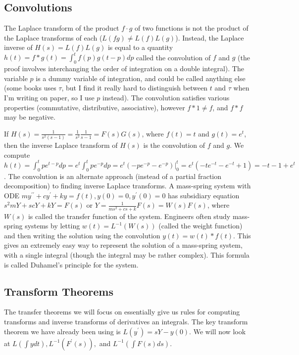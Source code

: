\subsection{Convolutions}
The Laplace transform of the product $f\cdot g$ of two functions is not the product of the Laplace transforms of each ($L(fg)\neq L(f)L(g)$).  Instead, the Laplace inverse of $H(s) = L(f)L(g)$ is equal to a quantity $h(t) = f * g (t) = \int_0^t f(p)g(t-p)dp$ called the convolution of $f$ and $g$ (the proof involves interchanging the order of integration on a double integral). The variable $p$ is a dummy variable of integration, and could be called anything else (some books uses $\tau$, but I find it really hard to distinguish between $t$ and $\tau$ when I'm writing on paper, so I use $p$ instead). The convolution satisfies various properties (commutative, distributive, associative), however $f* 1\neq f$, and $f * f$ may be negative.

If $H(s) = \frac{1}{s^2(s-1)} = \frac{1}{s^2}\frac{1}{s-1} = F(s)G(s)$, where $f(t)=t$ and $g(t)=e^t$, then the inverse Laplace transform of $H(s)$ is the convolution of $f$ and $g$. We compute $h(t) = \int_0^t p e^{t-p}dp= e^t\int_0^tpe^{-p}dp = e^t\left(-pe^{-p}-e^{-p}\right)\big|_0^t=e^t\left(-te^{-t}-e^{-t}+1\right) = -t-1+e^t$.  The convolution is an alternate approach (instead of a partial fraction decomposition) to finding inverse Laplace transforms. A mass-spring system with ODE $my^{\prime\prime}+cy^\prime+ky=f(t),y(0)=0,y^\prime(0)=0$ has subsidiary equation $s^2mY+scY+kY=F(s)$ or $Y=\frac{1}{ms^2+cs+k}F(s)=W(s)F(s)$, where $W(s)$ is called the transfer function of the system.  Engineers often study mass-spring systems by letting $w(t)=L^{-1}(W(s))$ (called the weight function) and then writing the solution using the convolution $y(t)=w(t)*f(t)$. This gives an extremely easy way to represent the solution of a mass-spring system, with a single integral (though the integral may be rather complex). This formula is called Duhamel's principle for the system. 

\subsection{Transform Theorems}
The transfer theorems we will focus on essentially give us rules for computing transforms and inverse transforms of derivatives an integrals.  The key transform theorem we have already been using is $L(y^\prime) = sY-y(0)$. We will now look at $L(\int y dt), L^{-1}(F^\prime (s)),$ and $L^{-1}(\int F(s) ds)$.


